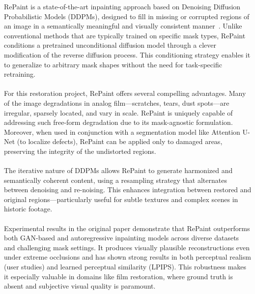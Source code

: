 \documentclass[openany, 12pt]{article}
\begin{document}
	RePaint is a state-of-the-art inpainting approach based on Denoising Diffusion Probabilistic Models (DDPMs), designed to fill in missing or corrupted regions of an image in a semantically meaningful and visually consistent manner~\cite{lugmayr_repaint_2022}. Unlike conventional methods that are typically trained on specific mask types, RePaint conditions a pretrained unconditional diffusion model through a clever modification of the reverse diffusion process. This conditioning strategy enables it to generalize to arbitrary mask shapes without the need for task-specific retraining.\\
	\\
	For this restoration project, RePaint offers several compelling advantages. Many of the image degradations in analog film—scratches, tears, dust spots—are irregular, sparsely located, and vary in scale. RePaint is uniquely capable of addressing such free-form degradation due to its mask-agnostic formulation. Moreover, when used in conjunction with a segmentation model like Attention U-Net (to localize defects), RePaint can be applied only to damaged areas, preserving the integrity of the undistorted regions.\\
	\\
	The iterative nature of DDPMs allows RePaint to generate harmonized and semantically coherent content, using a resampling strategy that alternates between denoising and re-noising. This enhances integration between restored and original regions—particularly useful for subtle textures and complex scenes in historic footage.\\
	\\
	Experimental results in the original paper demonstrate that RePaint outperforms both GAN-based and autoregressive inpainting models across diverse datasets and challenging mask settings. It produces visually plausible reconstructions even under extreme occlusions and has shown strong results in both perceptual realism (user studies) and learned perceptual similarity (LPIPS). This robustness makes it especially valuable in domains like film restoration, where ground truth is absent and subjective visual quality is paramount.
	 
	
\end{document}
